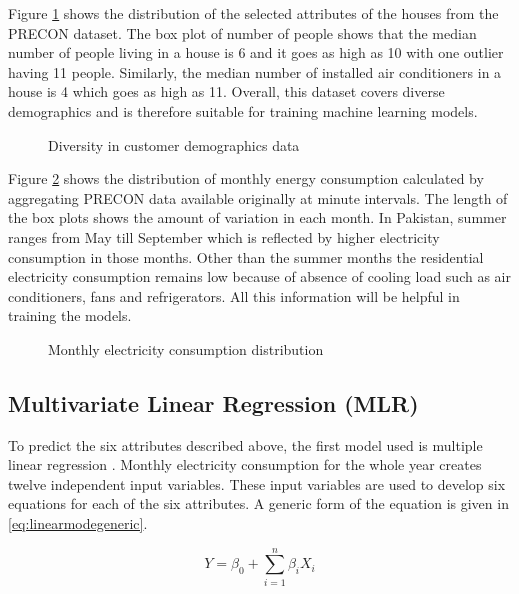 \documentclass[conference]{IEEEtran}
\begin{document}
Figure \ref{fig:metadata divers} shows the distribution of the selected attributes of the houses from the PRECON dataset. The box plot of number of people shows that the median number of people living in a house is 6 and it goes as high as 10 with one outlier having 11 people. Similarly, the median number of installed air conditioners in a house is 4 which goes as high as 11. Overall, this dataset covers diverse demographics and is therefore suitable for training machine learning models. 


\begin{figure}[ht]
\caption{Diversity in customer demographics data}
\label{fig:metadata divers}
\end{figure}

Figure \ref{fig:consumption distri} shows the distribution of monthly energy consumption calculated by aggregating PRECON data available originally at minute intervals. The length of the box plots shows the amount of variation in each month. In Pakistan, summer ranges from May till September which is reflected by higher electricity consumption in those months. Other than the summer months the residential electricity consumption remains low because of absence of cooling load such as air conditioners, fans and refrigerators. All this information will be helpful in training the models.



\begin{figure}[ht]
\caption{Monthly electricity consumption distribution}
\label{fig:consumption distri}
\end{figure}


\subsection{Multivariate Linear Regression (MLR)}

To predict the six attributes described above, the first model used is multiple linear regression \cite{bottenberg1963applied}. Monthly electricity consumption for the whole year creates twelve independent input variables. These input variables are used to develop six equations for each of the six attributes. A generic form of the equation is given in \ref{eq:linearmodegeneric}.   

\begin{equation}
Y = \beta_0 + \sum_{i = 1}^{n}\beta_i X_i 
\label{eq:linearmodegeneric}
\end{equation}
\end{document}
